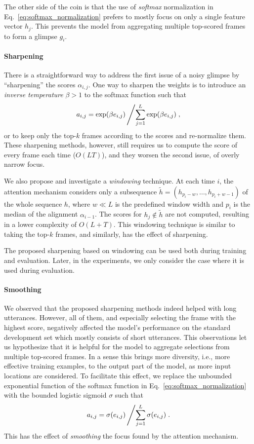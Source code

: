 \documentclass{article}
\begin{document}
The other side of the coin is that the use of {\it softmax} normalization in
Eq.~\eqref{eq:softmax_normalization} prefers to mostly focus on only a single
feature vector $h_j$. This prevents the model from aggregating multiple
top-scored frames to form a glimpse $g_i$.  

\paragraph{Sharpening}

There is a straightforward way to address the first issue of a noisy glimpse by
``sharpening'' the scores $\alpha_{i,j}$. One way to sharpen the weights is to
introduce an {\it inverse temperature} $\beta > 1$ to the softmax function such
that
\[
    a_{i,j}=\exp(\beta e_{i,j})\left/ \sum_{j=1}^{L}\exp(\beta e_{i,j})\right.,
\]
or to keep only the top-$k$ frames according to the scores and re-normalize
them.  These sharpening methods, however, still requires us to compute the score
of every frame each time ($O(LT)$), and they worsen the second issue, of overly narrow 
focus.

We also propose and investigate a {\it windowing} technique.
At each time $i$, the attention mechanism considers only a subsequence
$\tilde{h} = (h_{p_i-w}, \ldots, h_{p_i+w-1})$ of the whole sequence $h$, where 
$w \ll L$ is the predefined window width and $p_i$ is the median of the alignment
$\alpha_{i-1}$. The scores for $h_j \notin \tilde{h}$ are not computed, 
resulting in a lower complexity of $O(L+T)$.
This windowing technique is similar to taking the top-$k$ frames, and similarly,
has the effect of sharpening.


The proposed sharpening based on windowing can be used both during training and
evaluation. Later, in the experiments, we only consider the case where it is
used during evaluation.

\paragraph{Smoothing}

We observed that the proposed sharpening methods indeed
helped with long utterances. However, all of them, and
especially selecting the frame with the highest score,
negatively affected the model's performance on the standard
development set which mostly consists of short utterances.
This observations let us hypothesize that it is helpful for
the model to aggregate selections from multiple top-scored
frames. In a sense this brings more diversity, i.e., more
effective training examples, to the output part of the model,
as more input locations are considered.
To facilitate this effect, we replace the
unbounded exponential
function of the softmax function in
Eq.~\eqref{eq:softmax_normalization} with the
bounded logistic sigmoid $\sigma$ such that 
\[
    a_{i,j}=\sigma(e_{i,j})\left/\sum_{j=1}^{L}\sigma(e_{i,j})\right..
\]
This has the effect of {\it smoothing} the focus found by the attention
mechanism.
\end{document}

